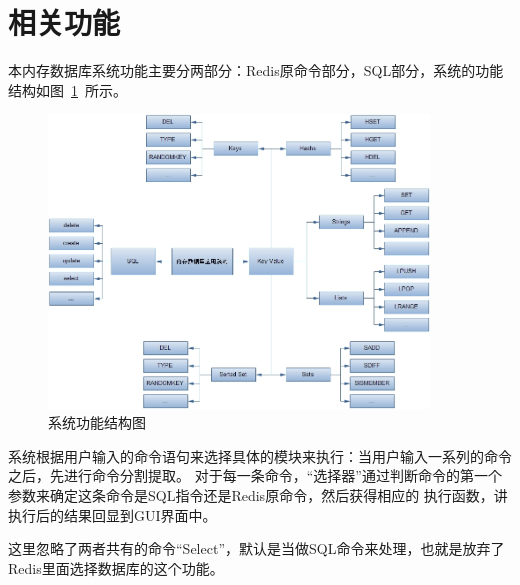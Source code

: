 \documentclass{zjutthesis}
\begin{document}
\section{相关功能}
本内存数据库系统功能主要分两部分：Redis原命令部分，SQL部分，系统的功能结构如图~\ref{fig:Command}~所示。
\begin{figure}[H]
\centering
\includegraphics[width=0.9\textwidth]{Command}
\caption{系统功能结构图}\label{fig:Command}
\vspace{\baselineskip} %
\end{figure}

系统根据用户输入的命令语句来选择具体的模块来执行：当用户输入一系列的命令之后，先进行命令分割提取。
对于每一条命令，“选择器”通过判断命令的第一个参数来确定这条命令是SQL指令还是Redis原命令，然后获得相应的
执行函数，讲执行后的结果回显到GUI界面中。

这里忽略了两者共有的命令“Select”，默认是当做SQL命令来处理，也就是放弃了Redis里面选择数据库的这个功能。
\end{document}
